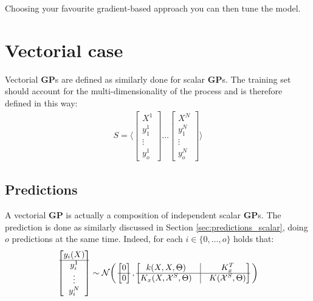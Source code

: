 \documentclass{article}
\begin{document}
Choosing your favourite gradient-based approach you can then tune the model.

\section{Vectorial case}

Vectorial \textbf{GP}s are defined as similarly done for scalar \textbf{GP}s.
The training set should account for the multi-dimensionality of the process and is therefore defined in this way:
\begin{eqnarray}
S = \bigg \langle
\begin{bmatrix} X^1 \\ \hline y^1_1 \\ \vdots \\ y^1_o \end{bmatrix} 
\hdots
\begin{bmatrix} X^N \\ \hline y^N_1 \\ \vdots \\ y^N_o \end{bmatrix} 
\bigg \rangle
\end{eqnarray}

\subsection{Predictions}

A vectorial \textbf{GP} is actually a composition of independent scalar \textbf{GP}s.
The prediction is done as similarly discussed in Section \ref{sec:predictions_scalar}, doing $o$ predictions at the same time. Indeed, for each $i \in \lbrace 0, \hdots ,o \rbrace$ holds that:
\begin{eqnarray}
\begin{bmatrix} y_i(X) \\ \hline y_i^1 \\ \vdots \\ y_i^N \\ \end{bmatrix} \sim
\mathcal{N} \bigg ( 
\begin{bmatrix} 0 \\ \hline 0 \end{bmatrix},
\begin{bmatrix}
k(X,X, \Theta) & \vline & K_x^T \\ 
\hline
K_x(X, \mathcal{X}^S, \Theta) & \vline & K(\mathcal{X}^S, \Theta)
\end{bmatrix}
\bigg )
\end{eqnarray}
\end{document}
